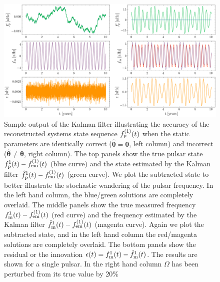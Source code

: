 \documentclass[fleqn,usenatbib,useAMS]{mnras}
\begin{document}
\begin{figure}
	\includegraphics[width=\textwidth, height =0.5\textwidth]{images/Kalman_example_both}
	\caption{Sample output of the Kalman filter illustrating the accuracy of the reconstructed systems state sequence $f_{\rm p}^{(1)}(t)$ when the static parameters are identically correct (${\boldsymbol{\hat\theta}} = {\boldsymbol{\theta}}$, left column) and incorrect (${\boldsymbol{\hat\theta}} \neq {\boldsymbol{\theta}}$, right column). The top panels show the true pulsar state $f_{\rm p}^{1}(t) - f_{\rm em}^{(1)}(t)$ (blue curve) and the state estimated by the Kalman filter $\hat{f}_{\rm p}^{1}(t) - f_{\rm em}^{(1)}(t)$  (green curve). We plot the subtracted state to better illustrate the stochastic wandering of the pulsar frequency. In the left hand column, the blue/green solutions are completely overlaid. The middle panels show the true measured frequency $f_{\rm m}^{1}(t) - f_{\rm em}^{(1)}(t)$ (red curve) and the frequency estimated  by the Kalman filter $\hat{f}_{\rm m}^{1}(t) - f_{\rm em}^{(1)}(t)$ (magenta curve). Again we plot the subtracted state, and in the left hand column the red/magenta solutions are completely overlaid. The bottom panels show the residual or the innovation $\epsilon(t) =f_{\rm m}^{1}(t) - \hat{f}_{\rm m}^{1}(t)$. The results are shown for a single pulsar. In the right hand column $\Omega$ has been perturbed from its true value by 20\%} 
	\label{fig:kalman_example}
\end{figure}
\end{document}
